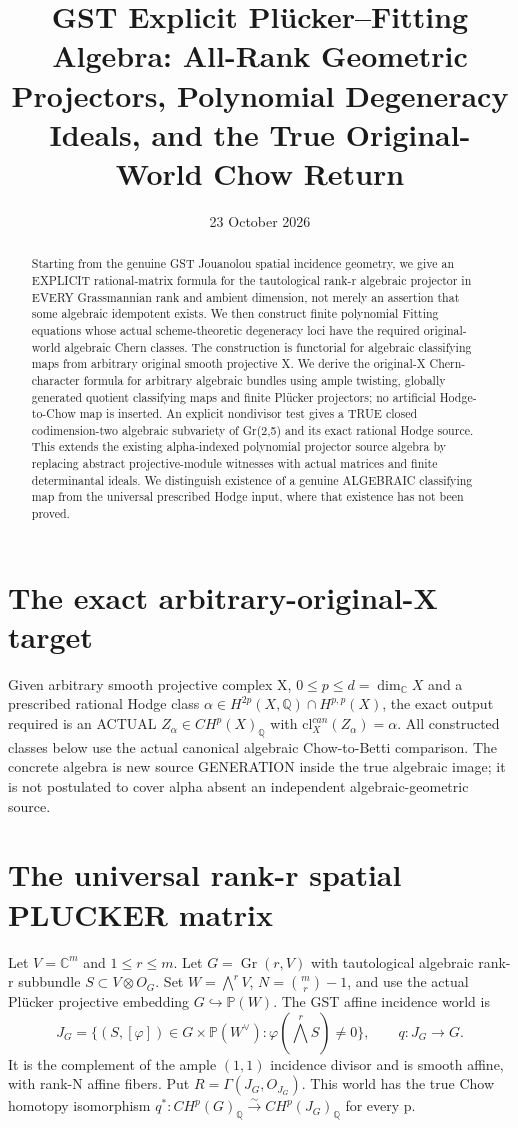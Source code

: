 \documentclass[11pt]{article}
\title{GST Explicit Pl\"ucker--Fitting Algebra:
All-Rank Geometric Projectors, Polynomial Degeneracy Ideals,
and the True Original-World Chow Return}
\date{23 October 2026}
\begin{document}
\maketitle
\begin{abstract}
Starting from the genuine GST Jouanolou spatial incidence
geometry, we give an EXPLICIT rational-matrix formula for
the tautological rank-r algebraic projector in EVERY
Grassmannian rank and ambient dimension, not merely an
assertion that some algebraic idempotent exists.
We then construct finite polynomial Fitting equations
whose actual scheme-theoretic degeneracy loci have
the required original-world algebraic Chern classes.
The construction is functorial for algebraic classifying
maps from arbitrary original smooth projective X.
We derive the original-X Chern-character formula
for arbitrary algebraic bundles using ample twisting,
globally generated quotient classifying maps and finite
Pl\"ucker projectors; no artificial Hodge-to-Chow map
is inserted. An explicit nondivisor test gives a
TRUE closed codimension-two algebraic subvariety of
Gr(2,5) and its exact rational Hodge source.
This extends the existing alpha-indexed polynomial
projector source algebra by replacing abstract
projective-module witnesses with actual matrices
and finite determinantal ideals.
We distinguish existence of a genuine ALGEBRAIC
classifying map from the universal prescribed Hodge
input, where that existence has not been proved.
\end{abstract}

\section{The exact arbitrary-original-X target}
Given arbitrary smooth projective complex X,
$0\le p\le d=\dim_\mathbb C X$ and a prescribed
rational Hodge class
$\alpha\in H^{2p}(X,\mathbb Q)\cap H^{p,p}(X)$,
the exact output required is an ACTUAL
$Z_\alpha\in CH^p(X)_\mathbb Q$ with
$\mathrm{cl}_X^{can}(Z_\alpha)=\alpha$.
All constructed classes below use the actual
canonical algebraic Chow-to-Betti comparison.
The concrete algebra is new source GENERATION
inside the true algebraic image; it is not
postulated to cover alpha absent an
independent algebraic-geometric source.

\section{The universal rank-r spatial PLUCKER matrix}
Let $V=\mathbb C^m$ and
$1\le r\le m$. Let
$G=\operatorname{Gr}(r,V)$ with
tautological algebraic rank-r subbundle
$S\subset V\otimes O_G$.
Set $W=\bigwedge^r V$,
$N=\binom mr-1$, and use the
actual Pl\"ucker projective embedding
$G\hookrightarrow\mathbb P(W)$.
The GST affine incidence world is
\[
 \boxed{
 J_G=\{(S,[\varphi])\in
 G\times\mathbb P(W^\vee):
       \varphi(\bigwedge^r S)\ne0\},
 \qquad q:J_G\to G.
 }                                                     \tag{1}
\]
It is the complement of the ample
$(1,1)$ incidence divisor and is
smooth affine, with rank-N affine
fibers. Put $R=\Gamma(J_G,O_{J_G})$.
This world has the true Chow
homotopy isomorphism
$q^*:CH^p(G)_\mathbb Q\overset{\sim}\to
CH^p(J_G)_\mathbb Q$ for every p.
\end{document}
